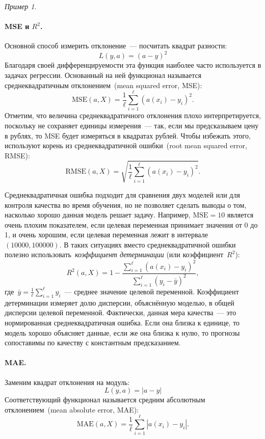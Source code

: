 \documentclass[a4paper, 12pt]{article}
\theoremstyle{plain} %
\theoremstyle{definition} %
\theoremstyle{remark} %
\newtheorem{example}{Пример}
\begin{document}
\begin{example}
\paragraph{MSE и $R^2$.}

Основной способ измерить отклонение~--- посчитать квадрат разности:
\[
    L(y, a) = (a - y)^2
\]
Благодаря своей дифференцируемости эта функция наиболее часто используется в задачах регрессии.
Основанный на ней функционал называется среднеквадратичным отклонением~(mean squared error, MSE):
\[
    \text{MSE}(a, X)
    =
    \frac{1}{\ell}
    \sum_{i = 1}^{\ell} \left(
        a(x_i) - y_i
    \right)^2.
\]
Отметим, что величина среднеквадратичного отклонения плохо интерпретируется,
поскольку не сохраняет единицы измерения~--- так, если мы предсказываем цену
в рублях, то MSE будет измеряться в квадратах рублей.
Чтобы избежать этого, используют корень из среднеквадратичной ошибки~(root mean squared error, RMSE):
\[
    \text{RMSE}(a, X)
    =
    \sqrt{
        \frac{1}{\ell}
        \sum_{i = 1}^{\ell} \left(
            a(x_i) - y_i
        \right)^2
    }.
\]

Среднеквадратичная ошибка подходит для сравнения двух моделей
или для контроля качества во время обучения,
но не позволяет сделать выводы о том, насколько хорошо данная модель
решает задачу.
Например, $\text{MSE}=10$ является очень плохим показателем,
если целевая переменная принимает значения от 0 до 1,
и очень хорошим, если целевая переменная лежит в интервале~$(10000, 100000)$.
В таких ситуациях вместо среднеквадратичной ошибки полезно использовать~\emph{коэффициент детерминации}
(или коэффициент~$R^2$):
\[
    R^2(a, X)
    =
    1
    -
    \frac{
        \sum_{i = 1}^{\ell} (a(x_i) - y_i)^2
    }{
        \sum_{i = 1}^{\ell} (y_i - \bar y)^2
    },
\]
где~$\bar y = \frac{1}{\ell} \sum_{i = 1}^{\ell} y_i$~--- среднее значение целевой переменной.
Коэффициент детерминации измеряет долю дисперсии, объяснённую моделью, в общей дисперсии
целевой переменной.
Фактически, данная мера качества~--- это нормированная среднеквадратичная ошибка.
Если она близка к единице, то модель хорошо объясняет данные,
если же она близка к нулю, то прогнозы сопоставимы по качеству с константным предсказанием.

\paragraph{MAE.}

Заменим квадрат отклонения на модуль:
\[
    L(y, a) = |a - y|
\]
Соответствующий функционал называется средним абсолютным отклонением~(mean absolute error, MAE):
\[
    \text{MAE}(a, X)
    =
    \frac{1}{\ell}
    \sum_{i = 1}^{\ell} \left|
        a(x_i) - y_i
    \right|.
\]


\end{example}
\end{document}
